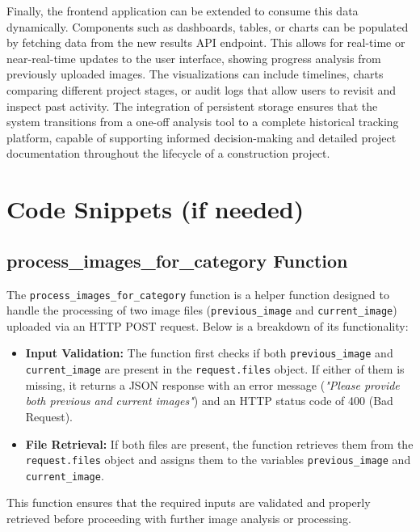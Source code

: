 Finally, the frontend application can be extended to consume this data dynamically. Components such as dashboards, tables, or charts can be populated by fetching data from the new results API endpoint. This allows for real-time or near-real-time updates to the user interface, showing progress analysis from previously uploaded images. The visualizations can include timelines, charts comparing different project stages, or audit logs that allow users to revisit and inspect past activity. The integration of persistent storage ensures that the system transitions from a one-off analysis tool to a complete historical tracking platform, capable of supporting informed decision-making and detailed project documentation throughout the lifecycle of a construction project.

\setlength{\baselineskip}{1.0\baselineskip}

\section{Code Snippets (if needed)}

\subsection{process\_images\_for\_category Function}
The \texttt{process\_images\_for\_category} function is a helper function designed to handle the processing of two image files (\texttt{previous\_image} and \texttt{current\_image}) uploaded via an HTTP POST request. Below is a breakdown of its functionality:

\begin{itemize}
    \item \textbf{Input Validation:} The function first checks if both \texttt{previous\_image} and \texttt{current\_image} are present in the \texttt{request.files} object. If either of them is missing, it returns a JSON response with an error message (\textit{"Please provide both previous and current images"}) and an HTTP status code of 400 (Bad Request).
    \item \textbf{File Retrieval:} If both files are present, the function retrieves them from the \texttt{request.files} object and assigns them to the variables \texttt{previous\_image} and \texttt{current\_image}.
\end{itemize}

This function ensures that the required inputs are validated and properly retrieved before proceeding with further image analysis or processing.

